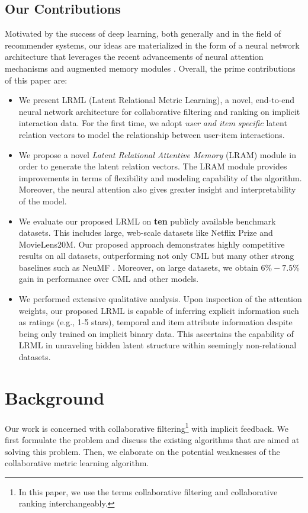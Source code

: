 \documentclass[sigconf]{acmart}
\begin{document}
\subsection{Our Contributions}

Motivated by the success of deep learning, both generally and in the field of recommender systems, our ideas are materialized in the form of a neural network architecture that leverages the recent advancements of neural attention mechanisms and augmented memory modules \cite{DBLP:conf/nips/SukhbaatarSWF15}. Overall, the prime contributions of this paper are:

\begin{itemize}
\item We present \textsc{LRML} (Latent Relational Metric Learning), a novel, end-to-end neural network architecture for collaborative filtering and ranking on implicit interaction data. For the first time, we adopt \textit{user and item specific} latent relation vectors to model the relationship between user-item interactions. 
\item We propose a novel \emph{Latent Relational Attentive Memory} (LRAM) module in order to generate the latent relation vectors. The LRAM module provides improvements in terms of flexibility and modeling capability of the algorithm. Moreover, the neural attention also gives greater insight and interpretability of the model. 
\item We evaluate our proposed \textsc{LRML} on \textbf{ten} publicly available benchmark datasets. This includes large, web-scale datasets like Netflix Prize and MovieLens20M. Our proposed approach demonstrates highly competitive results on all datasets, outperforming not only CML but many other strong baselines such as NeuMF \cite{He:2017:NCF:3038912.3052569}. Moreover, on large datasets, we obtain $6\%-7.5\%$ gain in performance over CML and other models.   
\item We performed extensive qualitative analysis. Upon inspection of the attention weights, our proposed \textsc{LRML} is capable of inferring explicit information such as ratings (e.g., 1-5 stars), temporal and item attribute information despite being only trained on implicit binary data. This ascertains the capability of \textsc{LRML} in unraveling hidden latent structure within seemingly non-relational datasets. 
\end{itemize}


\section{Background}
Our work is concerned with collaborative filtering\footnote{In this paper, we use the terms collaborative filtering and collaborative ranking interchangeably.} with implicit feedback. We first formulate the problem and discuss the existing algorithms that are aimed at solving this problem. Then, we elaborate on the potential weaknesses of the collaborative metric learning algorithm.
\end{document}
